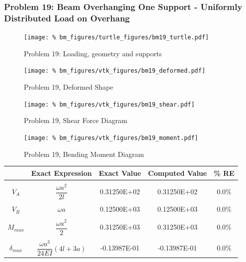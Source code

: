 %
%

\clearpage
\subsubsection{Problem 19: Beam Overhanging One Support - Uniformly Distributed Load on Overhang}
\begin{figure}[h]
    \texttt{[image: \%
                            bm\_figures/turtle\_figures/bm19\_turtle.pdf]}
    \centering
    \caption{Problem 19: Loading, geometry and supports}
    \label{fig:bm19_turtle}
\end{figure}


\begin{figure}[!htb]
    \texttt{[image: \%
                     bm\_figures/vtk\_figures/bm19\_deformed.pdf]}
    \centering
    \caption{Problem 19, Deformed Shape}
    \label{fig:bm19_deformed}
\end{figure}
\begin{figure}[!htb]
    \texttt{[image: \%
                     bm\_figures/vtk\_figures/bm19\_shear.pdf]}
    \centering
    \caption{Problem 19, Shear Force Diagram}
    \label{fig:bm19_shear}
\end{figure}
\begin{figure}[!htb]
    \texttt{[image: \%
                     bm\_figures/vtk\_figures/bm19\_moment.pdf]}
    \centering
    \caption{Problem 19, Bending Moment Diagram}
    \label{fig:bm19_moment}
\end{figure}
\begin{table}[h!]
\centering
\begin{tabular}{ c| c c c c }
    & Exact Expression & Exact Value & Computed Value & \% RE \\ \hline \\
    $V_A$  & $\dfrac{\omega a^2}{2l}$ & 0.31250E+02 & 0.31250E+02 & 0.0\% \\ \\
    $V_B$  & $\omega a$ & 0.12500E+03 & 0.12500E+03 & 0.0\% \\ \\
    $M_{max}$ & $\dfrac{\omega a^2}{2}$ & 0.31250E+03 & 0.31250E+03 & 0.0\% \\ \\
    $\delta_{max}$ & $\dfrac{\omega a^3}{24EI}(4l+3a)$ & -0.13987E-01 &-0.13987E-01 & 0.0\% \\
\end{tabular}
\end{table}

